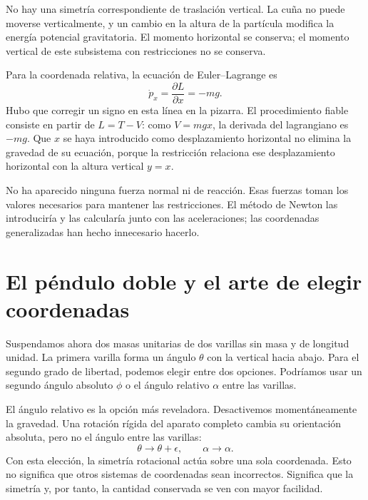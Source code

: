 No hay una simetría correspondiente de traslación vertical. La cuña no puede moverse verticalmente, y un cambio en la altura de la partícula modifica la energía potencial gravitatoria. El momento horizontal se conserva; el momento vertical de este subsistema con restricciones no se conserva.

Para la coordenada relativa, la ecuación de Euler--Lagrange es
\begin{equation}
  \dot p_x=\frac{\partial L}{\partial x}=-mg.
  \label{eq:l6-wedge-force}
\end{equation}
Hubo que corregir un signo en esta línea en la pizarra. El procedimiento fiable consiste en partir de \(L=T-V\): como \(V=mgx\), la derivada del lagrangiano es \(-mg\). Que \(x\) se haya introducido como desplazamiento horizontal no elimina la gravedad de su ecuación, porque la restricción relaciona ese desplazamiento horizontal con la altura vertical \(y=x\).

No ha aparecido ninguna fuerza normal ni de reacción. Esas fuerzas toman los valores necesarios para mantener las restricciones. El método de Newton las introduciría y las calcularía junto con las aceleraciones; las coordenadas generalizadas han hecho innecesario hacerlo.

\section{El péndulo doble y el arte de elegir coordenadas}

Suspendamos ahora dos masas unitarias de dos varillas sin masa y de longitud unidad. La primera varilla forma un ángulo \(\theta\) con la vertical hacia abajo. Para el segundo grado de libertad, podemos elegir entre dos opciones. Podríamos usar un segundo ángulo absoluto \(\phi\) o el ángulo relativo \(\alpha\) entre las varillas.

El ángulo relativo es la opción más reveladora. Desactivemos momentáneamente la gravedad. Una rotación rígida del aparato completo cambia su orientación absoluta, pero no el ángulo entre las varillas:
\begin{equation}
  \theta\longrightarrow\theta+\epsilon,
  \qquad
  \alpha\longrightarrow\alpha.
  \label{eq:l6-double-rotation}
\end{equation}
Con esta elección, la simetría rotacional actúa sobre una sola coordenada. Esto no significa que otros sistemas de coordenadas sean incorrectos. Significa que la simetría y, por tanto, la cantidad conservada se ven con mayor facilidad.

